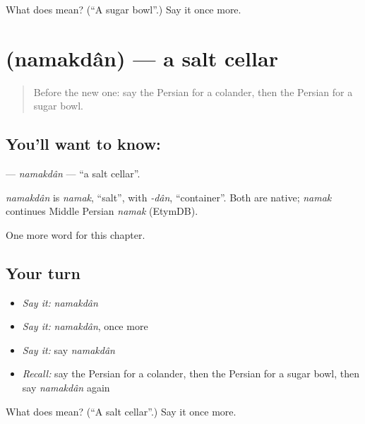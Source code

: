\begin{tcolorbox}[breakable,colback=teal!4,colframe=teal!35!black,title={Before you move on}]
What does  mean? (\textquotedblleft{}A sugar bowl\textquotedblright{}.) Say it once more.
\end{tcolorbox}
\section[\texorpdfstring{\fa{نمکدان} (namakdân)}{نمکدان (namakdân)}]{ (namakdân) — a salt cellar}

\label{lesson:FA-C174-namakdan}



\begin{quote}
Before the new one: say the Persian for a colander, then the Persian for a sugar bowl.
\end{quote}

\subsection*{You'll want to know: }
\textbf{} — \emph{namakdân} — \textquotedblleft{}a salt cellar\textquotedblright{}.

\begin{cousinweb}
\emph{namakdân} is \emph{namak}, \textquotedblleft{}salt\textquotedblright{}, with \emph{-dân}, \textquotedblleft{}container\textquotedblright{}. Both are native; \emph{namak} continues Middle Persian \emph{namak} (EtymDB).
\end{cousinweb}

\begin{grammarlens}[title={What you've built}]
One more word for this chapter.
\end{grammarlens}

\subsection*{Your turn}
\begin{itemize}
\raggedright
  \item \emph{Say it:} \emph{namakdân}
  \item \emph{Say it:} \emph{namakdân}, once more
  \item \emph{Say it:} say \emph{namakdân}
  \item \emph{Recall:} say the Persian for a colander, then the Persian for a sugar bowl, then say \emph{namakdân} again
\end{itemize}

\begin{tcolorbox}[breakable,colback=teal!4,colframe=teal!35!black,title={Before you move on}]
What does  mean? (\textquotedblleft{}A salt cellar\textquotedblright{}.) Say it once more.
\end{tcolorbox}
